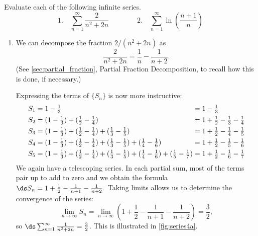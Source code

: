 \begin{example}\label{ex_series4}
Evaluate each of the following infinite series.
\[
 \text{1.}\quad\sum_{n=1}^\infty \frac{2}{n^2+2n}\qquad\qquad
 \text{2.}\quad\sum_{n=1}^\infty \ln\left(\frac{n+1}{n}\right)
\]
\solution
\begin{enumerate}
\item		We can decompose the fraction $2/(n^2+2n)$ as
\[\frac2{n^2+2n} = \frac1n-\frac1{n+2}.\]
(See \autoref{sec:partial_fraction}, Partial Fraction Decomposition, to recall how  this is done, if necessary.)

Expressing the terms of $\{S_n\}$ is now more instructive:%
{%
\small%
\begin{align*}
S_1 &= 1-\tfrac13 &&= 1-\tfrac13\\
S_2 &= (1-\tfrac13) + (\tfrac12-\tfrac14) &&= 1+\tfrac12-\tfrac13-\tfrac14\\
S_3 &= (1-\tfrac13) + (\tfrac12-\tfrac14) + (\tfrac13-\tfrac15)
&&= 1+\tfrac12-\tfrac14-\tfrac15\\
S_4 &= (1-\tfrac13) + (\tfrac12-\tfrac14) + (\tfrac13-\tfrac15) + (\tfrac14-\tfrac16)
&&= 1+\tfrac12-\tfrac15-\tfrac16\\
S_5 &= (1-\tfrac13) + (\tfrac12-\tfrac14) + (\tfrac13-\tfrac15) + (\tfrac14-\tfrac16) + (\tfrac15-\tfrac17)\mkern-18mu
&&= 1+\tfrac12-\tfrac16-\tfrac17
\end{align*}}%
%
%
%
We again have a telescoping series. In each partial sum, most of the terms pair up to add to zero and we obtain the formula $\ds S_n = 1+\frac12-\frac1{n+1}-\frac1{n+2}.$ Taking limits allows us to determine the convergence of the series:
\[
\lim_{n\to\infty}S_n
= \lim_{n\to\infty} \left(1+\frac12-\frac1{n+1}-\frac1{n+2}\right) = \frac32,
\]
so $\ds\sum_{n=1}^\infty \frac1{n^2+2n} = \frac32$.
This is illustrated in \autoref{fig:series4a}.


\end{enumerate}
\end{example}
